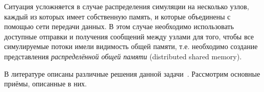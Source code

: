 Ситуация усложняется в случае распределения симуляции на несколько узлов, каждый из которых имеет собственную память, и которые объединены с помощью сети передачи данных. В этом случае необходимо использовать доступные отправки и получения сообщений между узлами для того, чтобы все симулируемые потоки имели видимость общей памяти, т.е. необходимо создание представления \textit{распределённой общей памяти} (\abbr distributed shared memory).

В литературе описаны различные решения данной задачи~\cite{Bugnion97disco:running, graphite2010}. Рассмотрим основные приёмы, описанные в них.

%     
%     
%     
% 

